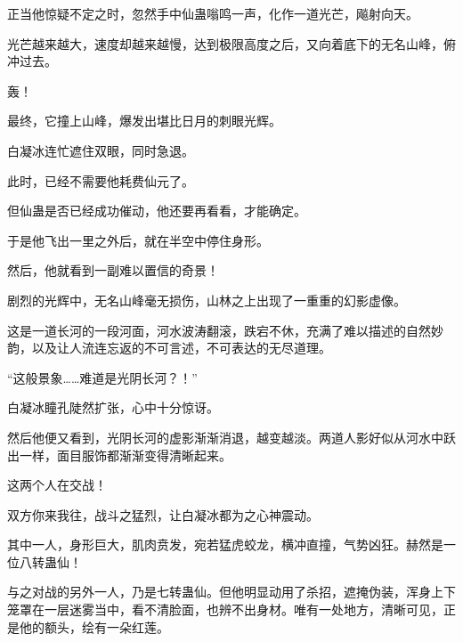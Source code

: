 \begin{this_body}
正当他惊疑不定之时，忽然手中仙蛊嗡鸣一声，化作一道光芒，飚射向天。

光芒越来越大，速度却越来越慢，达到极限高度之后，又向着底下的无名山峰，俯冲过去。

轰！

最终，它撞上山峰，爆发出堪比日月的刺眼光辉。

白凝冰连忙遮住双眼，同时急退。

此时，已经不需要他耗费仙元了。

但仙蛊是否已经成功催动，他还要再看看，才能确定。

于是他飞出一里之外后，就在半空中停住身形。

然后，他就看到一副难以置信的奇景！

剧烈的光辉中，无名山峰毫无损伤，山林之上出现了一重重的幻影虚像。

这是一道长河的一段河面，河水波涛翻滚，跌宕不休，充满了难以描述的自然妙韵，以及让人流连忘返的不可言述，不可表达的无尽道理。

“这般景象……难道是光阴长河？！”

白凝冰瞳孔陡然扩张，心中十分惊讶。

然后他便又看到，光阴长河的虚影渐渐消退，越变越淡。两道人影好似从河水中跃出一样，面目服饰都渐渐变得清晰起来。

这两个人在交战！

双方你来我往，战斗之猛烈，让白凝冰都为之心神震动。

其中一人，身形巨大，肌肉贲发，宛若猛虎蛟龙，横冲直撞，气势凶狂。赫然是一位八转蛊仙！

与之对战的另外一人，乃是七转蛊仙。但他明显动用了杀招，遮掩伪装，浑身上下笼罩在一层迷雾当中，看不清脸面，也辨不出身材。唯有一处地方，清晰可见，正是他的额头，绘有一朵红莲。

\end{this_body}

